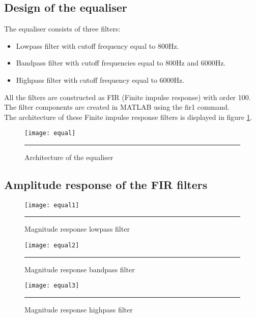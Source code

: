 \subsection{Design of the equaliser}
The equaliser consists of three filters:
\begin{itemize}
\item Lowpass filter with cutoff frequency equal to 800Hz.
\item Bandpass filter with cutoff frequencies equal to 800Hz and 6000Hz.
\item Highpass filter with cutoff frequency equal to 6000Hz.
\end{itemize}
All the filters are constructed as FIR (Finite impulse response) with order 100. 
The filter components are created in MATLAB using the fir1 command.\\
The architecture of these Finite impulse response filters is displayed in figure \ref{fig:equal}.
\begin{figure}[htbp]
\centering
\texttt{[image: equal]}
\rule{30em}{0.5pt}
\caption{Architecture of the equaliser}
\label{fig:equal}
\end{figure}
\subsection{Amplitude response of the FIR filters}
\begin{figure}[htbp]
\centering
\texttt{[image: equal1]}
\rule{30em}{0.5pt}
\caption{Magnitude response lowpass filter}
\label{fig:equal1}
\end{figure}
\begin{figure}[htbp]
\centering
\texttt{[image: equal2]}
\rule{30em}{0.5pt}
\caption{Magnitude response bandpass filter}
\label{fig:equal2}
\end{figure}
\begin{figure}[htbp]
\centering
\texttt{[image: equal3]}
\rule{30em}{0.5pt}
\caption{Magnitude response highpass filter}
\label{fig:equal3}
\end{figure}
